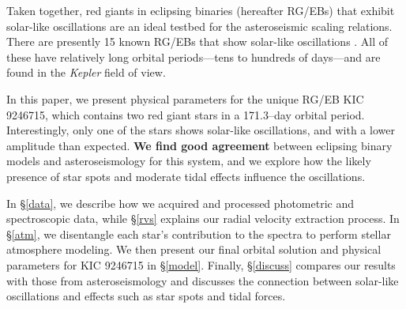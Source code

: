 Taken together, red giants in eclipsing binaries (hereafter RG/EBs) that exhibit solar-like oscillations are an ideal testbed for the asteroseismic scaling relations. There are presently 15 known RG/EBs that show solar-like oscillations \citep{gau13,gau14}. All of these have relatively long orbital periods---tens to hundreds of days---and are found in the \emph{Kepler} field of view. 

In this paper, we present physical parameters for the unique RG/EB KIC 9246715, which contains two red giant stars in a 171.3--day orbital period. Interestingly, only one of the stars shows solar-like oscillations, and with a lower amplitude than expected. \textbf{We find good agreement} between eclipsing binary models and asteroseismology for this system, and we explore how the likely presence of star spots and moderate tidal effects influence the oscillations.

In \S \ref{data}, we describe how we acquired and processed photometric and spectroscopic data, while \S \ref{rvs} explains our radial velocity extraction process. In \S \ref{atm}, we disentangle each star's contribution to the spectra to perform stellar atmosphere modeling. We then present our final orbital solution and physical parameters for KIC 9246715 in \S \ref{model}. Finally, \S \ref{discuss} compares our results with those from asteroseismology and discusses the connection between solar-like oscillations and effects such as star spots and tidal forces.
